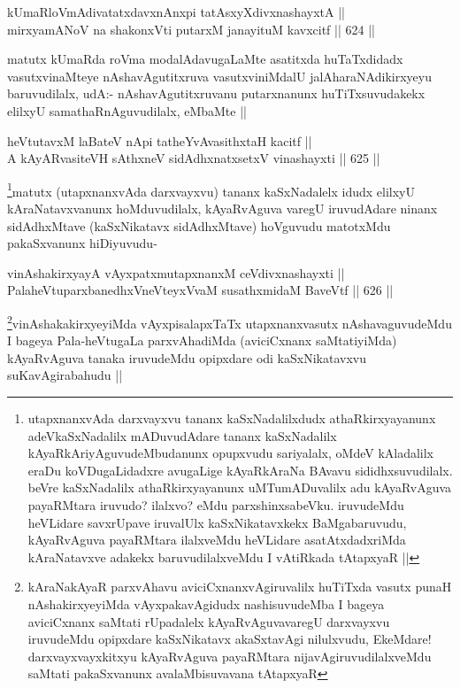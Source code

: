 
\begin{shl}
kUmaRloVmAdivatatxdavxnAnxpi tatAsxyXdivxnashayxtA || \\
mirxyamANoV na shakonxVti putarxM janayituM kavxcitf ||  624 ||  
\end{shl}

\begin{artha}
matutx kUmaRda roVma modalAdavugaLaMte asatitxda huTaTxdidadx vasutxvinaMteye  nAshavAgutitxruva vasutxviniMdalU jalAharaNAdikirxyeyu baruvudilalx, udA:- nAshavAgutitxruvanu putarxnanunx huTiTxsuvudakekx elilxyU samathaRnAguvudilalx, eMbaMte ||
\end{artha}

\begin{shl}
heVtutavxM laBateV nApi tatheYvAvasithxtaH kacitf || \\
A kAyARvasiteVH sAthxneV sidAdhxnatxsetxV vinashayxti ||  625 ||  
\end{shl}

\begin{artha}
\footnote{utapxnanxvAda darxvayxvu tananx kaSxNadalilxdudx athaRkirxyayanunx adeVkaSxNadalilx mADuvudAdare tananx kaSxNadalilx kAyaRkAriyAguvudeMbudanunx opupxvudu sariyalalx, oMdeV kAladalilx eraDu koVDugaLidadxre avugaLige kAyaRkAraNa BAvavu sididhxsuvudilalx. beVre kaSxNadalilx athaRkirxyayanunx uMTumADuvalilx adu kAyaRvAguva payaRMtara iruvudo? ilalxvo? eMdu parxshinxsabeVku. iruvudeMdu heVLidare savxrUpave iruvalUlx kaSxNikatavxkekx BaMgabaruvudu, kAyaRvAguva payaRMtara ilalxveMdu heVLidare asatAtxdadxriMda kAraNatavxve adakekx baruvudilalxveMdu I vAtiRkada tAtapxyaR ||}matutx (utapxnanxvAda darxvayxvu) tananx kaSxNadalelx idudx elilxyU kAraNatavxvanunx hoMduvudilalx, kAyaRvAguva varegU iruvudAdare ninanx sidAdhxMtave (kaSxNikatavx sidAdhxMtave) hoVguvudu matotxMdu pakaSxvanunx hiDiyuvudu-
\end{artha}

\begin{shl}
vinAshakirxyayA vAyxpatxmutapxnanxM ceVdivxnashayxti || \\
PalaheVtuparxbanedhxVneVteyxVvaM susathxmidaM BaveVtf ||  626 ||  
\end{shl}

\begin{artha}
\footnote{kAraNakAyaR parxvAhavu aviciCxnanxvAgiruvalilx huTiTxda vasutx punaH nAshakirxyeyiMda vAyxpakavAgidudx nashisuvudeMba I bageya aviciCxnanx saMtati rUpadalelx kAyaRvAguvavaregU darxvayxvu iruvudeMdu opipxdare kaSxNikatavx akaSxtavAgi nilulxvudu, EkeMdare! darxvayxvayxkitxyu kAyaRvAguva payaRMtara nijavAgiruvudilalxveMdu saMtati pakaSxvanunx avalaMbisuvavana tAtapxyaR}vinAshakakirxyeyiMda vAyxpisalapxTaTx utapxnanxvasutx nAshavaguvudeMdu I bageya Pala-heVtugaLa parxvAhadiMda (aviciCxnanx saMtatiyiMda) kAyaRvAguva tanaka iruvudeMdu opipxdare odi kaSxNikatavxvu suKavAgirabahudu ||
\end{artha}

